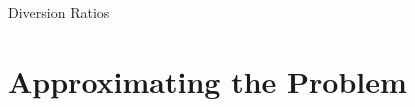 \begin{frame}{Diversion Ratios}
\begin{center}
\scalebox{0.6}{

}
\end{center}
\end{frame}


\section{Approximating the Problem}




